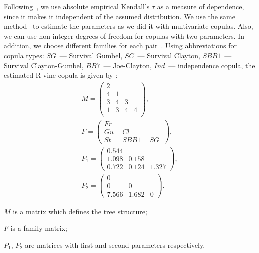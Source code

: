 Following~\cite{Dissmann2013}, we use absolute empirical Kendall's $\tau$ as a measure of dependence, since it makes it independent of the assumed distribution. 
We use the same method~\cite{Koj2010} to estimate the parameters as we did it with multivariate copulas. Also, we can use non-integer degrees of freedom for copulas with two parameters. 
In addition, we choose different families for each pair~\cite{Bel2010, Clarke2007, Vuong1989}. 
Using abbreviations for copula types: $SG$~--- Survival Gumbel, $SC$~--- Survival Clayton, $SBB1$~--- Survival Clayton-Gumbel, $BB7$~--- Joe-Clayton, $Ind$~--- independence copula, the estimated R-vine copula is given by \cite{Czado2010}:
\begin{gather} \label{eng:vinefit}
    M = \left(
        \begin{array}{cccc}
        2 &   &   &   \\
        4 & 1 &   &   \\
        3 & 4 & 3 &   \\
        1 & 3 & 4 & 4 \\
        \end{array} \right), \\
    F = \left(
        \begin{array}{lll}%
        Fr\ &\  &    \\
        Gu\ &\ Cl\ &   \\
        St\ &\ SBB1\ &\ SG\
        \end{array} \right), \nonumber\\    
    P_1 = \left(
        \begin{array}{ccc}
        0.544 & & \\
        1.098 & 0.158 & \\
        0.722 & 0.124 & 1.327
        \end{array} \right), \nonumber\\
    P_2 = \left(
        \begin{array}{ccc}
        0 &  & \\
        0 & 0 & \\
        7.566 & 1.682 & 0
        \end{array} \right). \nonumber
\end{gather}
\begin{where*}
    \item $M$ is a matrix which defines the tree structure;
    \item $F$ is a family matrix;
    \item $P_1$, $P_2$ are matrices with first and second parameters respectively.
\end{where*}

